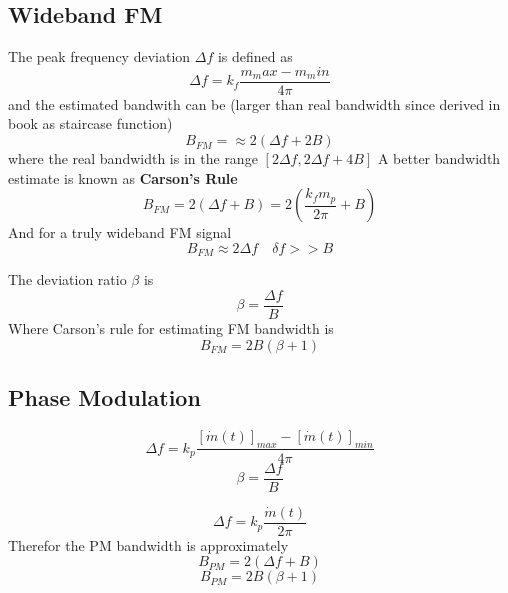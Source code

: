 \documentclass{article}
\begin{document}
    \subsection{Wideband FM}
    The peak frequency deviation $\Delta f$ is defined as
    \begin{equation}
        \Delta f = k_f \frac{m_max-m_min}{4\pi}
    \end{equation}
    and the estimated bandwith can be (larger than real bandwidth since derived in book as staircase function)
    \begin{equation}
        B_{FM} = \approx 2(\Delta f + 2B)
    \end{equation}
    where the real bandwidth is in the range $[2\Delta f, 2\Delta f + 4B]$
    A better bandwidth estimate is known as \textbf{Carson's Rule}
    \begin{equation}
        B_{FM} = 2(\Delta f + B) = 2(\frac{k_fm_p}{2\pi} + B)
    \end{equation}
    And for a truly wideband FM signal 
    \begin{equation}
        B_{FM} \approx 2\Delta f \quad \delta f >> B
    \end{equation}

    The deviation ratio $\beta$ is
    \begin{equation}
        \beta = \frac{\Delta f}{B}
    \end{equation}
    Where Carson's rule for estimating FM bandwidth is 
    \begin{equation}
        B_{FM} = 2B(\beta + 1)
    \end{equation}

    \subsection{Phase Modulation}
    \begin{equation}
        \Delta f = k_p \frac{[\dot{m}(t)]_{max} - [\dot{m}(t)]_{min}}{4\pi}
    \end{equation}
    \begin{equation}
        \beta = \frac{\Delta f}{B}
    \end{equation}

    \begin{equation}
        \Delta f = k_p \frac{\dot{m}(t)}{2\pi}
    \end{equation}
    Therefor the PM bandwidth is approximately 
    \begin{equation}
        B_{PM} = 2(\Delta f + B)
    \end{equation}
    \begin{equation}
        B_{PM} = 2B(\beta + 1)
    \end{equation}
\end{document}
